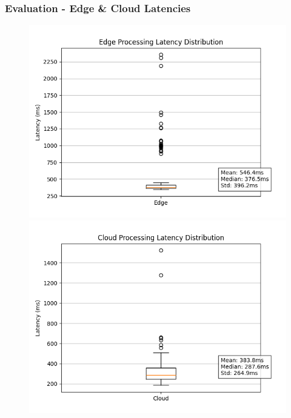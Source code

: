 \documentclass{beamer}
\begin{document}
\begin{frame}
\frametitle{Evaluation - Edge \& Cloud Latencies}

\begin{figure}
    \centering
    \begin{minipage}{0.48\textwidth}
        \centering
        \includegraphics[width=\linewidth]{./res/edge_latencies.png}
    \end{minipage}
    \hfill
    \begin{minipage}{0.48\textwidth}
        \centering
        \includegraphics[width=\linewidth]{./res/cloud_latencies.png}
    \end{minipage}
\end{figure}

\end{frame}
\end{document}
